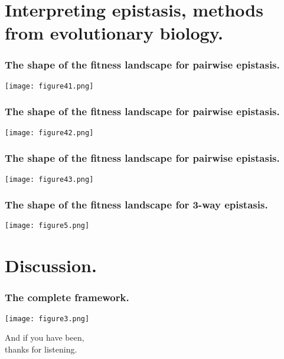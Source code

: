 \documentclass[10pt]{beamer}
\begin{document}
\section{Interpreting epistasis, methods from evolutionary biology.}

\begin{frame}
\frametitle{The shape of the fitness landscape for pairwise epistasis.}
	\begin{center}
       \texttt{[image: figure41.png]}
	\end{center}
\end{frame}

\begin{frame}
\frametitle{The shape of the fitness landscape for pairwise epistasis.}
	\begin{center}
       \texttt{[image: figure42.png]}
	\end{center}
\end{frame}

\begin{frame}
\frametitle{The shape of the fitness landscape for pairwise epistasis.}
	\begin{center}
       \texttt{[image: figure43.png]}
	\end{center}
\end{frame}

\begin{frame}
\frametitle{The shape of the fitness landscape for 3-way epistasis.}
	\begin{center}
       \texttt{[image: figure5.png]}
	\end{center}
\end{frame}

\section{Discussion.}

\begin{frame}
\frametitle{The complete framework.}
	\begin{center}
       \texttt{[image: figure3.png]}
	\end{center}
\end{frame}

\begin{frame}

	\begin{center}
	\Huge And if you have been, \\thanks for listening.
	\end{center}
	
\end{frame}
\end{document}
